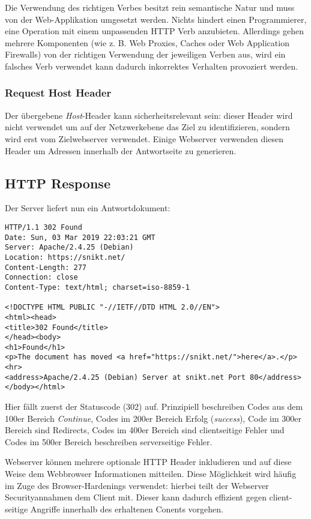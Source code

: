 Die Verwendung des richtigen Verbes besitzt rein semantische Natur und muss von der Web-Applikation umgesetzt werden. Nichts hindert einen Programmierer, eine Operation mit einem unpassenden HTTP Verb anzubieten. Allerdings gehen mehrere Komponenten (wie z. B. Web Proxies, Caches oder Web Application Firewalls) von der richtigen Verwendung der jeweiligen Verben aus, wird ein falsches Verb verwendet kann dadurch inkorrektes Verhalten provoziert werden.

\subsubsection{Request Host Header}

Der übergebene \textit{Host}-Header kann sicherheitsrelevant sein: dieser Header wird nicht verwendet um auf der Netzwerkebene das Ziel zu identifizieren, sondern wird erst vom Zielwebserver verwendet. Einige Webserver verwenden diesen Header um Adressen innerhalb der Antwortseite zu generieren.

\subsection{HTTP Response}

Der Server liefert nun ein Antwortdokument:

\begin{verbatim}
HTTP/1.1 302 Found
Date: Sun, 03 Mar 2019 22:03:21 GMT
Server: Apache/2.4.25 (Debian)
Location: https://snikt.net/
Content-Length: 277
Connection: close
Content-Type: text/html; charset=iso-8859-1

<!DOCTYPE HTML PUBLIC "-//IETF//DTD HTML 2.0//EN">
<html><head>
<title>302 Found</title>
</head><body>
<h1>Found</h1>
<p>The document has moved <a href="https://snikt.net/">here</a>.</p>
<hr>
<address>Apache/2.4.25 (Debian) Server at snikt.net Port 80</address>
</body></html>
\end{verbatim}

Hier fällt zuerst der Statuscode (302) auf. Prinzipiell beschreiben Codes aus dem 100er Bereich \textit{Continue}, Codes im 200er Bereich Erfolg (\textit{success}), Code im 300er Bereich sind Redirects, Codes im 400er Bereich sind clientseitige Fehler und Codes im 500er Bereich beschreiben serverseitige Fehler.

Webserver können mehrere optionale HTTP Header inkludieren und auf diese Weise dem Webbrowser Informationen mitteilen. Diese Möglichkeit wird häufig im Zuge des Browser-Hardenings verwendet: hierbei teilt der Webserver Securityannahmen dem Client mit. Dieser kann dadurch effizient gegen client-seitige Angriffe innerhalb des erhaltenen Conents vorgehen.

